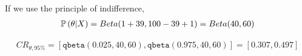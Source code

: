 \documentclass[12pt]{article}
\begin{document}
\begin{enumerate}


If we use the principle of indifference, 
\begin{align*}
    \mathbb{P}\left(\theta | X\right) = Beta(1  +39, 100 - 39 + 1) = Beta(40 , 60) 
\end{align*}

\begin{align*}
    CR_{\theta, 95\%} = [\texttt{qbeta}(0.025, 40, 60), \texttt{qbeta}(0.975, 40, 60)] = [0.307, 0.497]
\end{align*}

\end{enumerate}
\end{document}
